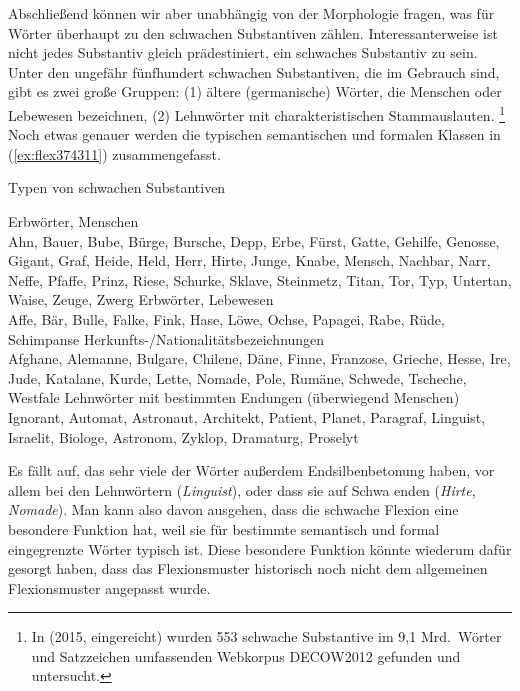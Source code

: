Abschließend können wir aber unabhängig von der Morphologie fragen, was für Wörter überhaupt zu den schwachen Substantiven zählen.
Interessanterweise ist nicht jedes Substantiv gleich prädestiniert, ein schwaches Substantiv zu sein.
Unter den ungefähr fünfhundert schwachen Substantiven, die im Gebrauch sind, gibt es zwei große Gruppen:
(1) ältere (germanische) Wörter, die Menschen oder Lebewesen bezeichnen,
(2) Lehnwörter mit charakteristischen Stammauslauten.%
\footnote{In \citeauthor{Schaefer2015b} (2015, eingereicht) wurden 553 schwache Substantive im 9,1 Mrd.\ Wörter und Satzzeichen umfassenden Webkorpus DECOW2012 gefunden und untersucht.}
Noch etwas genauer werden die typischen semantischen und formalen Klassen in (\ref{ex:flex374311}) zusammengefasst.

\begin{exe}
  \ex\label{ex:flex374311} Typen von schwachen Substantiven
  \begin{xlist}
    \ex\label{ex:flex374311a} Erbwörter, Menschen\\
    Ahn, Bauer, Bube, Bürge, Bursche, Depp, Erbe, Fürst, Gatte, Gehilfe, Genosse, Gigant, Graf, Heide, Held, Herr, Hirte, Junge, Knabe, Mensch, Nachbar, Narr, Neffe, Pfaffe, Prinz, Riese, Schurke, Sklave, Steinmetz, Titan, Tor, Typ, Untertan, Waise, Zeuge, Zwerg
    \ex\label{ex:flex374311b} Erbwörter, Lebewesen\\
    Affe, Bär, Bulle, Falke, Fink, Hase, Löwe, Ochse, Papagei, Rabe, Rüde, Schimpanse 
    \ex\label{ex:flex374311c} Herkunfts-\slash Nationalitätsbezeichnungen\\
    Afghane, Alemanne, Bulgare, Chilene, Däne, Finne, Franzose, Grieche, Hesse, Ire, Jude, Katalane, Kurde, Lette, Nomade, Pole, Rumäne, Schwede, Tscheche, Westfale
    \ex\label{ex:flex374311d} Lehnwörter mit bestimmten Endungen (überwiegend Menschen)\\
    Ignorant, Automat, Astronaut, Architekt, Patient, Planet, Paragraf, Linguist, Israelit, Biologe, Astronom, Zyklop, Dramaturg, Proselyt
  \end{xlist}
\end{exe}

Es fällt auf, das sehr viele der Wörter außerdem Endsilbenbetonung haben, vor allem bei den Lehnwörtern (\textit{Lingu\Akz ist}), oder dass sie auf Schwa enden (\textit{Hirte}, \textit{Nomade}).
Man kann also davon ausgehen, dass die schwache Flexion eine besondere Funktion hat, weil sie für bestimmte semantisch und formal eingegrenzte Wörter typisch ist.
Diese besondere Funktion könnte wiederum dafür gesorgt haben, dass das Flexionsmuster historisch noch nicht dem allgemeinen Flexionsmuster angepasst wurde.

